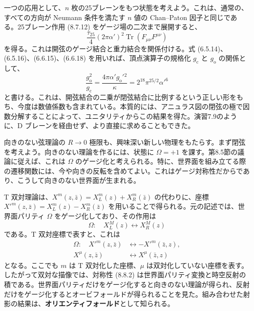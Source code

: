 一つの応用として、$n$ 枚の25ブレーンをもつ状態を考えよう。これは、通常の、すべての方向が Neumann 条件を満たす $n$ 値の Chan--Paton 因子と同じである。25ブレーン作用 (8.7.12) をゲージ場の二次まで展開すると、
\begin{equation}
\frac{\tau_{25}}4(2\pi\alpha')^2
\operatorname{Tr}(F_{\mu\nu}F^{\mu\nu})
\tag{8.7.27}\label{eq:8.7.27}
\end{equation}
を得る。これは開弦のゲージ結合と重力結合を関係付ける。式 (6.5.14)、(6.5.16)、(6.6.15)、(6.6.18) を用いれば、頂点演算子の規格化 $g_{\mathrm c}$ と $g_{\mathrm o}$ の関係として、
\begin{equation}
\frac{g_{\mathrm o}^2}{g_{\mathrm c}}
=\frac{4\pi\alpha'g_{\mathrm o}'{}^2}{\kappa}
=2^{18}\pi^{25/2}\alpha'^6
\tag{8.7.28}\label{eq:8.7.28}
\end{equation}
と書ける。これは、開弦結合の二乗が閉弦結合に比例するという正しい形をもち、今度は数値係数も含まれている。本質的には、アニュラス図の閉弦の極で因数分解することによって、ユニタリティからこの結果を得た。演習7.9のように、D ブレーンを経由せず、より直接に求めることもできた。

\label{sec:8.8}

向きのない弦理論の $R\to0$ 極限も、興味深い新しい物理をもたらす。まず閉弦を考えよう。向きのない理論を作るには、状態に $\Omega=+1$ を課す。第8.5節の議論に従えば、これは $\Omega$ のゲージ化と考えられる。特に、世界面を組み立てる際の遷移関数には、今や向きの反転を含めてよい。これはゲージ対称性だからであり、こうして向きのない世界面が生まれる。

T 双対理論は、$X^m(z,\bar z)=X_L^m(z)+X_R^m(\bar z)$ の代わりに、座標 $X'^m(z,\bar z)=X_L^m(z)-X_R^m(\bar z)$ を用いることで得られる。元の記述では、世界面パリティ $\Omega$ をゲージ化しており、その作用は
\begin{equation}
\Omega:\quad X_L^M(z)\longleftrightarrow X_R^M(z)
\tag{8.8.1}\label{eq:8.8.1}
\end{equation}
である。T 双対座標で表すと、これは
\begin{align}
\Omega:\quad X'^m(z,\bar z)&\longleftrightarrow-X'^m(\bar z,z),
\tag{8.8.2a}\label{eq:8.8.2a}\\
X^\mu(z,\bar z)&\longleftrightarrow X^\mu(\bar z,z)
\tag{8.8.2b}\label{eq:8.8.2b}
\end{align}
となる。ここでも $m$ は T 双対化した座標、$\mu$ は双対化していない座標を表す。したがって双対な描像では、対称性 (8.8.2) は世界面パリティ変換と時空反射の積である。世界面パリティだけをゲージ化すると向きのない理論が得られ、反射だけをゲージ化するとオービフォールドが得られることを見た。組み合わせた射影の結果は、\textbf{オリエンティフォールド}として知られる。

